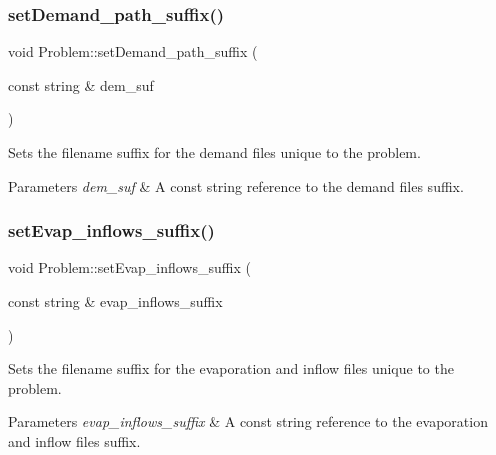 \subsubsection{\texorpdfstring{set\+Demand\+\_\+path\+\_\+suffix()}{setDemand\_path\_suffix()}}
{\footnotesize\ttfamily void Problem\+::set\+Demand\+\_\+path\+\_\+suffix (\begin{DoxyParamCaption}\item[{const string \&}]{dem\+\_\+suf }\end{DoxyParamCaption})}



Sets the filename suffix for the demand files unique to the problem. 


\begin{DoxyParams}{Parameters}
{\em dem\+\_\+suf} & A const string reference to the demand files suffix. \\
\hline
\end{DoxyParams}
\mbox{\label{classProblem_afb5e51664d0f340c393f7583622e99ca}} 
\subsubsection{\texorpdfstring{set\+Evap\+\_\+inflows\+\_\+suffix()}{setEvap\_inflows\_suffix()}}
{\footnotesize\ttfamily void Problem\+::set\+Evap\+\_\+inflows\+\_\+suffix (\begin{DoxyParamCaption}\item[{const string \&}]{evap\+\_\+inflows\+\_\+suffix }\end{DoxyParamCaption})}



Sets the filename suffix for the evaporation and inflow files unique to the problem. 


\begin{DoxyParams}{Parameters}
{\em evap\+\_\+inflows\+\_\+suffix} & A const string reference to the evaporation and inflow files suffix. \\
\hline
\end{DoxyParams}
\mbox{\label{classProblem_ad666ae2c231f49103593a7e03a3b58fd}} 
